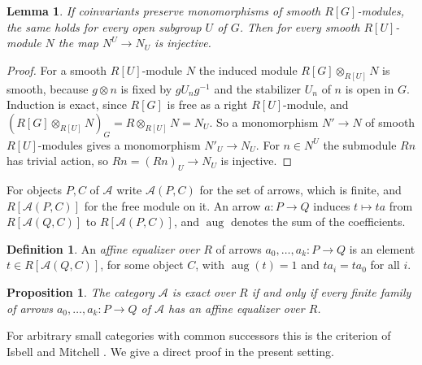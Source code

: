 \documentclass[11pt,a4paper]{article}
\newtheorem{proposition}[theorem]{Proposition}
\newtheorem{lemma}[theorem]{Lemma}
\theoremstyle{definition}
\newtheorem{definition}[theorem]{Definition}
\newcommand{\A}{\mathcal{A}}
\newcommand{\aug}{\operatorname{aug}}
\begin{document}
\begin{lemma}\label{lem:open}
If coinvariants preserve monomorphisms of smooth $R[G]$-modules, the same
holds for every open subgroup $U$ of $G$. Then for every smooth
$R[U]$-module $N$ the map $N^U\to N_U$ is injective.
\end{lemma}

\begin{proof}
For a smooth $R[U]$-module $N$ the induced module $R[G]\otimes_{R[U]}N$ is
smooth, because $g\otimes n$ is fixed by $gU_ng^{-1}$ and the stabilizer
$U_n$ of $n$ is open in $G$. Induction is exact, since $R[G]$ is free as a
right $R[U]$-module, and
$(R[G]\otimes_{R[U]}N)_G=R\otimes_{R[U]}N=N_U$. So a monomorphism
$N'\to N$ of smooth $R[U]$-modules gives a monomorphism $N'_U\to N_U$. For
$n\in N^U$ the submodule $Rn$ has trivial action, so $Rn=(Rn)_U\to N_U$ is
injective.
\end{proof}

For objects $P,C$ of $\A$ write $\A(P,C)$ for the set of arrows, which is
finite, and $R[\A(P,C)]$ for the free module on it. An arrow
$a\colon P\to Q$ induces $t\mapsto ta$ from $R[\A(Q,C)]$ to $R[\A(P,C)]$,
and $\aug$ denotes the sum of the coefficients.

\begin{definition}\label{def:affine}
An \emph{affine equalizer over $R$} of arrows $a_0,\dots,a_k\colon P\to Q$ is
an element $t\in R[\A(Q,C)]$, for some object $C$, with $\aug(t)=1$ and
$ta_i=ta_0$ for all $i$.
\end{definition}

\begin{proposition}\label{prop:affine}
The category $\A$ is exact over $R$ if and only if every finite family of
arrows $a_0,\dots,a_k\colon P\to Q$ of $\A$ has an affine equalizer over $R$.
\end{proposition}

For arbitrary small categories with common successors this is the criterion
of Isbell and Mitchell \cite[Theorem~3.1, Proposition~3.3]{IM}. We give a
direct proof in the present setting.
\end{document}
